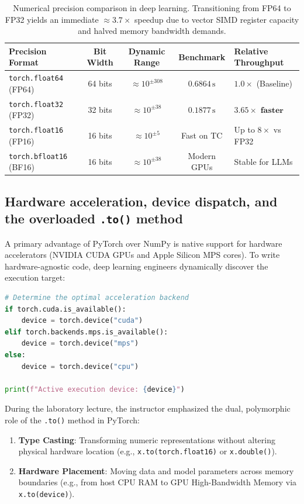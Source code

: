 \documentclass[../labs.tex]{subfiles}
\begin{document}
\begin{table}[htbp]
\centering
\small
\begin{tabularx}{\textwidth}{l c c c >{\raggedright\arraybackslash}X}
\toprule
\textbf{Precision Format} & \textbf{Bit Width} & \textbf{Dynamic Range} & \textbf{Benchmark} & \textbf{Relative Throughput} \\
\midrule
\texttt{torch.float64} (FP64) & 64 bits & $\approx 10^{\pm 308}$ & $0.6864\,\text{s}$ & $1.0\times$ (Baseline) \\
\texttt{torch.float32} (FP32) & 32 bits & $\approx 10^{\pm 38}$  & $0.1877\,\text{s}$ & $\mathbf{3.65\times\text{ faster}}$ \\
\texttt{torch.float16} (FP16) & 16 bits & $\approx 10^{\pm 5}$   & Fast on TC & Up to $8\times$ vs FP32 \\
\texttt{torch.bfloat16} (BF16) & 16 bits & $\approx 10^{\pm 38}$  & Modern GPUs & Stable for LLMs \\
\bottomrule
\end{tabularx}
\caption{Numerical precision comparison in deep learning. Transitioning from FP64 to FP32 yields an immediate $\approx 3.7\times$ speedup due to vector SIMD register capacity and halved memory bandwidth demands.}
\label{tab:precision_benchmark}
\end{table}

\subsection{Hardware acceleration, device dispatch, and the overloaded \texttt{.to()} method}
A primary advantage of PyTorch over NumPy is native support for hardware accelerators (NVIDIA CUDA GPUs and Apple Silicon MPS cores). To write hardware-agnostic code, deep learning engineers dynamically discover the execution target:

\begin{lstlisting}[language=Python, caption={Hardware-agnostic device configuration and tensor dispatch.}, label={lst:lab01_device_dispatch}]
# Determine the optimal acceleration backend
if torch.cuda.is_available():
    device = torch.device("cuda")
elif torch.backends.mps.is_available():
    device = torch.device("mps")
else:
    device = torch.device("cpu")

print(f"Active execution device: {device}")
\end{lstlisting}

During the laboratory lecture, the instructor emphasized the dual, polymorphic role of the \texttt{.to()} method in PyTorch:
\begin{enumerate}
    \item \textbf{Type Casting}: Transforming numeric representations without altering physical hardware location (e.g., \texttt{x.to(torch.float16)} or \texttt{x.double()}).
    \item \textbf{Hardware Placement}: Moving data and model parameters across memory boundaries (e.g., from host CPU RAM to GPU High-Bandwidth Memory via \texttt{x.to(device)}).
\end{enumerate}
\end{document}
